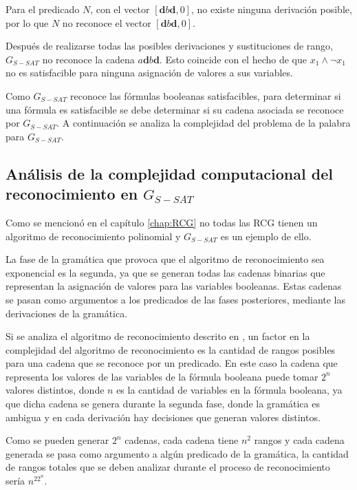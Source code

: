Para el predicado $N$, con el vector $[\mathbf{d}b\mathbf{d},0]$, no existe ninguna derivación posible, por lo que 
$N$ no reconoce el vector $[\mathbf{d}b\mathbf{d},0]$.

Después de realizarse todas las posibles derivaciones y sustituciones de rango, $G_{S-SAT}$ no reconoce la cadena
$a\mathbf{d}b\mathbf{d}$. Esto coincide con el hecho de que $x_1 \wedge \neg x_1$ no es satisfacible para ninguna asignación de valores a sus variables.


Como $G_{S-SAT}$ reconoce las fórmulas booleanas satisfacibles, para determinar si una fórmula es satisfacible se debe determinar si su cadena asociada se reconoce por $G_{S-SAT}$. A continuación se analiza la complejidad del problema de la palabra para $G_{S-SAT}$.

\subsection{Análisis de la complejidad computacional del reconocimiento en $G_{S-SAT}$}

Como se mencionó en el capítulo \ref{chap:RCG} no todas las RCG tienen un algoritmo de reconocimiento polinomial 
y $G_{S-SAT}$ es un ejemplo de ello.

La fase de la gramática que provoca que el algoritmo de reconocimiento sea exponencial es la segunda, ya que  se generan 
todas las cadenas binarias que representan la asignación de valores para las variables booleanas.
Estas cadenas se pasan como argumentos a los predicados de las fases posteriores, mediante las derivaciones de la gramática.

Si se analiza el algoritmo de reconocimiento descrito en \cite{mainRCGBib}, un factor en la complejidad del 
algoritmo de reconocimiento es la cantidad de rangos posibles para una cadena que se reconoce por un predicado. 
En este caso la cadena que representa los valores de las variables de la fórmula booleana puede tomar $2^n$
valores distintos, donde $n$ es la cantidad de variables en la fórmula booleana, ya que dicha cadena se genera 
durante la segunda fase, donde la gramática es ambigua y en cada derivación hay decisiones que generan valores 
distintos.

Como se pueden generar $2^n$ cadenas, cada cadena tiene $n^2$ rangos y cada cadena generada se pasa como 
argumento a algún predicado de la gramática, la cantidad de rangos totales que se deben analizar durante 
el proceso de reconocimiento sería $n^22^n$.

